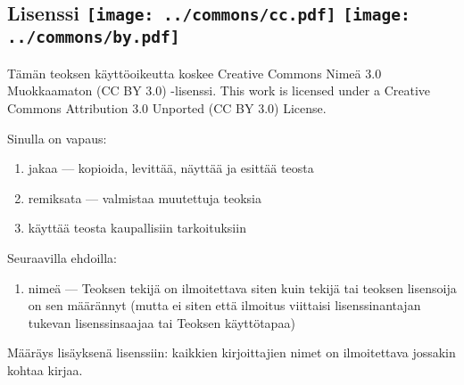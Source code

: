 \subsection*{Lisenssi \texttt{[image: ../commons/cc.pdf]} \texttt{[image: ../commons/by.pdf]}}

Tämän teoksen käyttöoikeutta koskee Creative Commons Nimeä 3.0 Muokkaamaton (CC BY 3.0) -lisenssi.
This work is licensed under a Creative Commons Attribution 3.0 Unported (CC BY 3.0) License.


Sinulla on vapaus:
\begin{enumerate}
\item jakaa — kopioida, levittää, näyttää ja esittää teosta
\item remiksata — valmistaa muutettuja teoksia
\item käyttää teosta kaupallisiin tarkoituksiin
\end{enumerate}
Seuraavilla ehdoilla:
\begin{enumerate}
\item nimeä — Teoksen tekijä on ilmoitettava siten kuin tekijä tai teoksen lisensoija on sen määrännyt (mutta ei siten että ilmoitus viittaisi lisenssinantajan tukevan lisenssinsaajaa tai Teoksen käyttötapaa)
\end{enumerate}

Määräys lisäyksenä lisenssiin: kaikkien kirjoittajien nimet on ilmoitettava jossakin kohtaa kirjaa.



